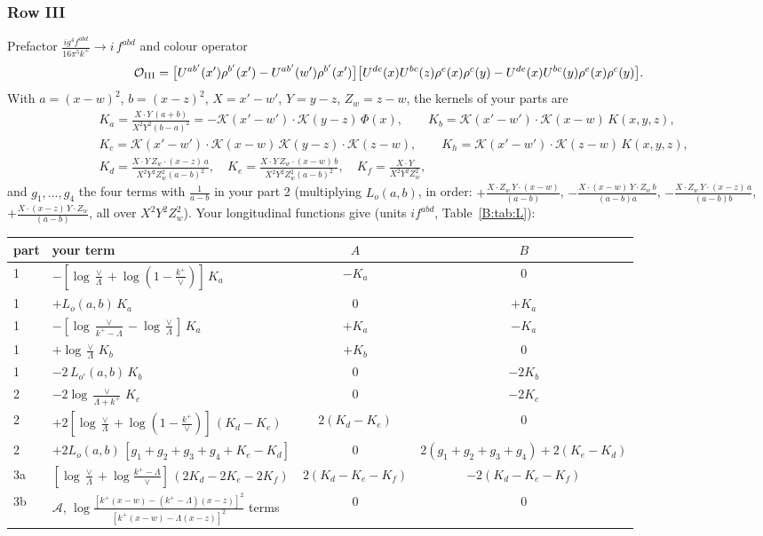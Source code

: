 \documentclass[10pt]{article}
\numberwithin{equation}{section}
\newcommand{\KK}{\mathcal K}
\begin{document}
\subsubsection{Row III}\label{B:sec:I.III}
Prefactor $\frac{ig^4f^{abd}}{16\pi^5k^+}\to i\,f^{abd}$ and colour operator
\[
\mathcal O_{\rm III}=\big[U^{ab'}(x')\rho^{b'}(x')-U^{ab'}(w')\rho^{b'}(x')\big]\big[U^{de}(x)U^{bc}(z)\rho^e(x)\rho^c(y)-U^{de}(x)U^{bc}(y)\rho^e(x)\rho^c(y)\big].
\]
With $a=(x-w)^2$, $b=(x-z)^2$, $X=x'-w'$, $Y=y-z$, $Z_w=z-w$, the kernels of your parts are
\begin{align*}
&K_a=\frac{X\cdot Y\,(a+b)}{X^2Y^2(b-a)^2}=-\KK(x'-w')\cdot\KK(y-z)\,\Phi(x),\qquad K_b=\KK(x'-w')\cdot\KK(x-w)\,K(x,y,z),\\
&K_c=\KK(x'-w')\cdot\KK(x-w)\,\KK(y-z)\cdot\KK(z-w),\qquad K_h=\KK(x'-w')\cdot\KK(z-w)\,K(x,y,z),\\
&K_d=\frac{X\cdot Y\,Z_w\cdot(x-z)\,a}{X^2Y^2Z_w^2(a-b)^2},\quad K_e=\frac{X\cdot Y\,Z_w\cdot(x-w)\,b}{X^2Y^2Z_w^2(a-b)^2},\quad K_f=\frac{X\cdot Y}{X^2Y^2Z_w^2},
\end{align*}
and $g_1,\dots,g_4$ the four terms with $\frac1{a-b}$ in your part 2 (multiplying $L_o(a,b)$, in order: $+\frac{X\cdot Z_w\,Y\cdot(x-w)}{(a-b)}$, $-\frac{X\cdot(x-w)\,Y\cdot Z_w\,b}{(a-b)a}$, $-\frac{X\cdot Z_w\,Y\cdot(x-z)\,a}{(a-b)b}$, $+\frac{X\cdot(x-z)\,Y\cdot Z_w}{(a-b)}$, all over $X^2Y^2Z_w^2$). Your longitudinal functions give (units $i f^{abd}$, Table~\ref{B:tab:L}):
\begin{center}\small
\begin{tabular}{@{}l l c c@{}}
part & your term & $A$ & $B$\\ \hline
1 & $-[\log\frac{\vee}{\Lambda}+\log(1-\frac{k^+}{\vee})]\,K_a$ & $-K_a$ & 0\\
1 & $+L_o(a,b)\,K_a$ & 0 & $+K_a$\\
1 & $-[\log\frac{\vee}{k^+-\Lambda}-\log\frac{\vee}{\Lambda}]\,K_a$ & $+K_a$ & $-K_a$\\
1 & $+\log\frac{\vee}{\Lambda}\,K_b$ & $+K_b$ & 0\\
1 & $-2\,L_{o'}(a,b)\,K_b$ & 0 & $-2K_b$\\
2 & $-2\log\frac{\vee}{\Lambda+k^+}\,K_c$ & 0 & $-2K_c$\\
2 & $+2[\log\frac{\vee}{\Lambda}+\log(1-\frac{k^+}{\vee})]\,(K_d-K_e)$ & $2(K_d-K_e)$ & 0\\
2 & $+2L_o(a,b)\,[g_1+g_2+g_3+g_4+K_e-K_d]$ & 0 & $2(g_1+g_2+g_3+g_4)+2(K_e-K_d)$\\
3a & $[\log\frac{\vee}{\Lambda}+\log\frac{k^+-\Lambda}{\vee}]\,(2K_d-2K_e-2K_f)$ & $2(K_d-K_e-K_f)$ & $-2(K_d-K_e-K_f)$\\
3b & $\mathcal A$, $\log\frac{[k^+(x-w)-(k^+-\Lambda)(x-z)]^2}{[k^+(x-w)-\Lambda(x-z)]^2}$ terms & 0 & 0\\
\end{tabular}
\end{center}
\end{document}
